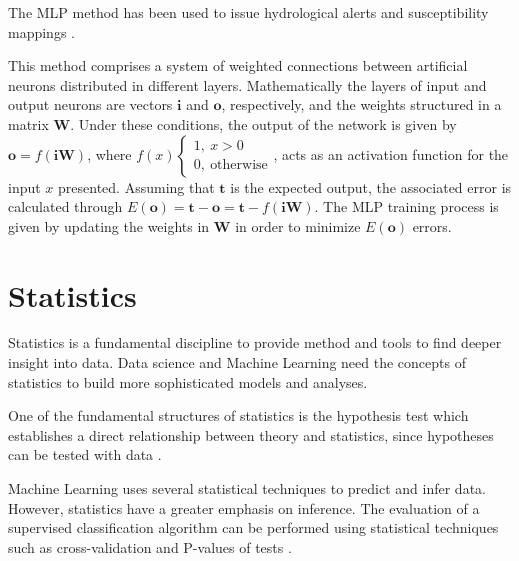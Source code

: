 The MLP method has been used to issue hydrological alerts and susceptibility mappings \cite{da2016utilizaccao,pacheco2020mapeamento}.

This method comprises a system of weighted connections between artificial neurons distributed in different layers. Mathematically the layers of input and output neurons are vectors $\mathbf{i}$ and $\mathbf{o}$, respectively, and the weights structured in a matrix $\mathbf{W}$. Under these conditions, the output of the network is given by $\mathbf{o}= f( \mathbf{iW}) $, where $f(x)\begin{cases}
	1, \ x>0 \\
	0, \ \textrm{otherwise}
\end{cases}$, acts as an activation function for the input $x$ presented.
Assuming that $\mathbf{t}$ is the expected output, the associated error is calculated through $E(\mathbf{o})=\mathbf{t}-\mathbf{o}=\mathbf{t}- f(\mathbf{iW})$.
The MLP training process is given by updating the weights in $\mathbf{W}$ in order to minimize $E(\mathbf{o})$ errors.

\section{Statistics}

Statistics is a fundamental discipline to provide method and tools to find deeper insight into data. Data science and Machine Learning need the concepts of statistics to build more sophisticated models and analyses. 

One of the fundamental structures of statistics is the hypothesis test which establishes a direct relationship between theory and statistics, since hypotheses can be tested with data \cite{weihs2018data}.

Machine Learning uses several statistical techniques to predict and infer data. However, statistics have a greater emphasis on inference. The evaluation of a supervised classification algorithm can be performed using statistical techniques such as cross-validation and P-values of tests \cite{ij2018statistics}. 

 